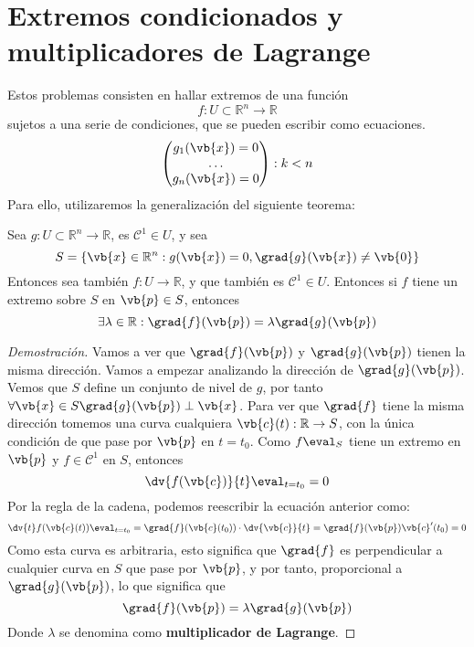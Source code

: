 \documentclass{../Calculo.tex}
\begin{document}
\section{Extremos condicionados y multiplicadores de Lagrange}
Estos problemas consisten en hallar extremos de una función
\[
	f:U \subset \mathbb{R}^{n} \to \mathbb{R}
\]
sujetos a una serie de condiciones, que se pueden escribir como ecuaciones.
\[
	\begin{pmatrix} 
	g_1(\vb{x})= 0\\
	\dots \\
	g_{n}(\vb{x}) = 0
	\end{pmatrix} : k < n
\]
Para ello, utilizaremos la generalización del siguiente teorema:
\begin{teorema}
Sea $g:U \subset \mathbb{R}^{n} \to \mathbb{R}$, es $\mathcal{C}^{1} \in U$, y sea
\[
	S = \{ \vb{x} \in \mathbb{R}^{n} : g(\vb{x})=0, \grad{g}(\vb{x}) \neq \vb{0} \}
\]
Entonces sea también $f: U \to \mathbb{R}$, y que también es $\mathcal{C}^{1} \in U$. Entonces si $f$ tiene un extremo sobre $S$ en $\vb{p} \in S$, entonces
\[
	\exists \lambda \in \mathbb{R}: \grad{f}(\vb{p})= \lambda \grad{g}(\vb{p})
\]
\end{teorema}
\begin{proof}[Demostración]
	Vamos a ver que $\grad{f}(\vb{p})$ y $\grad{g}(\vb{p})$ tienen la misma dirección. Vamos a empezar analizando la dirección de $\grad{g}(\vb{p})$. Vemos que $S$ define un conjunto de nivel de $g$, por tanto $\forall \vb{x} \in S \grad{g}(\vb{p}) \perp \vb{x}$. Para ver que $\grad{f}$ tiene la misma dirección tomemos una curva cualquiera $\vb{c}(t): \mathbb{R} \to S$, con la única condición de que pase por $\vb{p}$ en $t=t_0$. Como $f\eval_{S}$ tiene un extremo en $\vb{p}$ y $f \in \mathcal{C}^{1}$ en $S$, entonces
	\[
		\dv{f(\vb{c})}{t}\eval_{t=t_0} = 0
	\]
	Por la regla de la cadena, podemos reescribir la ecuación anterior como:
	\[
		\dv{t}f(\vb{c}(t))\eval_{t=t_0}=\grad{f}(\vb{c}(t_0))\cdot \dv{\vb{c}}{t}
		= \grad{f}(\vb{p}) \vb{c}'(t_0)=0
	\]
	Como esta curva es arbitraria, esto significa que $\grad{f}$ es perpendicular a cualquier curva en $S$ que pase por $\vb{p}$, y por tanto, proporcional a $\grad{g}(\vb{p})$, lo que significa que
	\[
		\grad{f}(\vb{p}) = \lambda\grad{g}(\vb{p})
	\]
	Donde $\lambda$ se denomina como \textbf{multiplicador de Lagrange}. 
\end{proof}
\end{document}
